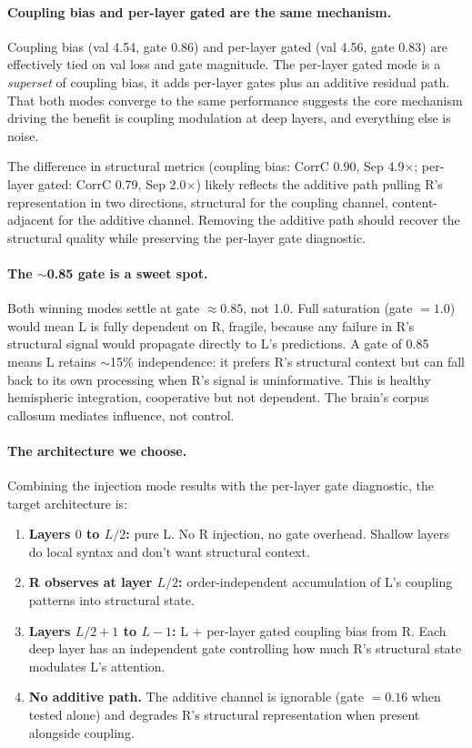 \documentclass[11pt, a4paper]{article}
\theoremstyle{plain}
\theoremstyle{definition}
\theoremstyle{remark}
\begin{document}
\paragraph{Coupling bias and per-layer gated are the same mechanism.}
Coupling bias (val 4.54, gate 0.86) and per-layer gated (val 4.56, gate 0.83) are effectively tied on val loss and gate magnitude.
The per-layer gated mode is a \emph{superset} of coupling bias, it adds per-layer gates plus an additive residual path.
That both modes converge to the same performance suggests the core mechanism driving the benefit is coupling modulation at deep layers, and everything else is noise.

The difference in structural metrics (coupling bias: CorrC 0.90, Sep 4.9$\times$; per-layer gated: CorrC 0.79, Sep 2.0$\times$) likely reflects the additive path pulling R's representation in two directions, structural for the coupling channel, content-adjacent for the additive channel.
Removing the additive path should recover the structural quality while preserving the per-layer gate diagnostic.

\paragraph{The $\sim$0.85 gate is a sweet spot.}
Both winning modes settle at gate $\approx 0.85$, not 1.0.
Full saturation (gate $= 1.0$) would mean L is fully dependent on R, fragile, because any failure in R's structural signal would propagate directly to L's predictions.
A gate of 0.85 means L retains $\sim$15\% independence: it prefers R's structural context but can fall back to its own processing when R's signal is uninformative.
This is healthy hemispheric integration, cooperative but not dependent.
The brain's corpus callosum mediates influence, not control.

\paragraph{The architecture we choose.}
Combining the injection mode results with the per-layer gate diagnostic, the target architecture is:

\begin{enumerate}[nosep]
\item \textbf{Layers $0$ to $L/2$:} pure L. No R injection, no gate overhead. Shallow layers do local syntax and don't want structural context.
\item \textbf{R observes at layer $L/2$:} order-independent accumulation of L's coupling patterns into structural state.
\item \textbf{Layers $L/2{+}1$ to $L{-}1$:} L $+$ per-layer gated coupling bias from R. Each deep layer has an independent gate controlling how much R's structural state modulates L's attention.
\item \textbf{No additive path.} The additive channel is ignorable (gate $= 0.16$ when tested alone) and degrades R's structural representation when present alongside coupling.
\end{enumerate}
\end{document}
